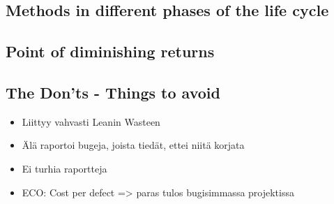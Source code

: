  \subsection{Methods in different phases of the life cycle}
 
 \subsection{Point of diminishing returns}
 
 \subsection{The Don'ts - Things to avoid}
 
 \begin{itemize}
 
 \item Liittyy vahvasti Leanin Wasteen
 \item Älä raportoi bugeja, joista tiedät, ettei niitä korjata
 \item Ei turhia raportteja
 \item ECO: Cost per defect => paras tulos bugisimmassa projektissa
 
 \end{itemize}
